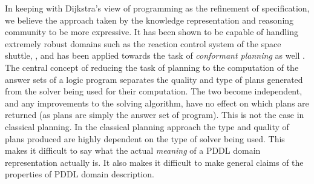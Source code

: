 \documentclass{article}
\begin{document}
In keeping with Dijkstra's view of programming as the refinement of specification, we believe the approach taken by the knowledge representation and reasoning community to be more expressive. It has been shown to be capable of handling extremely robust domains such as the reaction control system of the space shuttle, \cite{usa}, and has been applied towards the task of \emph{conformant planning} as well \cite{conformant}. The central concept of reducing the task of planning to the computation of the answer sets of a logic program separates the quality and type of plans generated from the solver being used for their computation. The two become independent, and any improvements to the solving algorithm, have no effect on which plans are returned (as plans are simply the answer set of program). This is not the case in classical planning. In the classical planning approach the type and quality of plans produced are highly dependent on the type of solver being used. This makes it difficult to say what the actual \emph{meaning} of a PDDL domain representation actually is. It also makes it difficult to make general claims of the properties of PDDL domain description.
\end{document}
